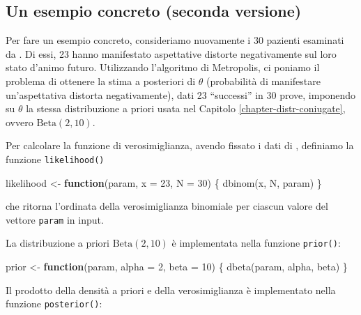 \documentclass[
  11pt,
]{krantz}
\makeatletter
\newenvironment{Shaded}{\begin{snugshade}}{\end{snugshade}}
\newcommand{\AttributeTok}[1]{\textcolor[rgb]{0.61,0.61,0.61}{#1}}
\newcommand{\ControlFlowTok}[1]{\textcolor[rgb]{0.27,0.27,0.27}{\textbf{#1}}}
\newcommand{\DecValTok}[1]{\textcolor[rgb]{0.06,0.06,0.06}{#1}}
\newcommand{\FunctionTok}[1]{\textcolor[rgb]{0,0,0}{#1}}
\newcommand{\NormalTok}[1]{#1}
\newcommand{\OtherTok}[1]{\textcolor[rgb]{0.37,0.37,0.37}{#1}}
\newenvironment{kframe}{%
\medskip{}
\setlength{\fboxsep}{.8em}
 \def\at@end@of@kframe{}%
 \ifinner\ifhmode%
  \def\at@end@of@kframe{\end{minipage}}%
  \begin{minipage}{\columnwidth}%
 \fi\fi%
 \def\FrameCommand##1{\hskip\@totalleftmargin \hskip-\fboxsep
 \colorbox{shadecolor}{##1}\hskip-\fboxsep
     \hskip-\linewidth \hskip-\@totalleftmargin \hskip\columnwidth}%
 \MakeFramed {\advance\hsize-\width
   \@totalleftmargin\z@ \linewidth\hsize
   \@setminipage}}%
 {\par\unskip\endMakeFramed%
 \at@end@of@kframe}
\renewenvironment{Shaded}{\begin{kframe}}{\end{kframe}}
\theoremstyle{definition}
\theoremstyle{definition}
\theoremstyle{definition}
\theoremstyle{definition}
\theoremstyle{remark}
\makeatother
\begin{document}
\hypertarget{un-esempio-concreto-seconda-versione}{%
\subsection{Un esempio concreto (seconda versione)}\label{un-esempio-concreto-seconda-versione}}

Per fare un esempio concreto, consideriamo nuovamente i 30 pazienti esaminati da \citet{zetschefuture2019}. Di essi, 23 hanno manifestato aspettative distorte negativamente sul loro stato d'animo futuro. Utilizzando l'algoritmo di Metropolis, ci poniamo il problema di ottenere la stima a posteriori di \(\theta\) (probabilità di manifestare un'aspettativa distorta negativamente), dati 23 ``successi'' in 30 prove, imponendo su \(\theta\) la stessa distribuzione a priori usata nel Capitolo \ref{chapter-distr-coniugate}, ovvero \(\mbox{Beta}(2, 10)\).

Per calcolare la funzione di verosimiglianza, avendo fissato i dati di \citet{zetschefuture2019}, definiamo la funzione \texttt{likelihood()}

\begin{Shaded}
\begin{Highlighting}[]
\NormalTok{likelihood }\OtherTok{\textless{}{-}} \ControlFlowTok{function}\NormalTok{(param, }\AttributeTok{x =} \DecValTok{23}\NormalTok{, }\AttributeTok{N =} \DecValTok{30}\NormalTok{) \{}
  \FunctionTok{dbinom}\NormalTok{(x, N, param)}
\NormalTok{\}}
\end{Highlighting}
\end{Shaded}

che ritorna l'ordinata della verosimiglianza binomiale per ciascun valore del vettore \texttt{param} in input.

La distribuzione a priori \(\mbox{Beta}(2, 10)\) è implementata nella funzione \texttt{prior()}:

\begin{Shaded}
\begin{Highlighting}[]
\NormalTok{prior }\OtherTok{\textless{}{-}} \ControlFlowTok{function}\NormalTok{(param, }\AttributeTok{alpha =} \DecValTok{2}\NormalTok{, }\AttributeTok{beta =} \DecValTok{10}\NormalTok{) \{}
  \FunctionTok{dbeta}\NormalTok{(param, alpha, beta) }
\NormalTok{\}}
\end{Highlighting}
\end{Shaded}

Il prodotto della densità a priori e della verosimiglianza è implementato nella funzione \texttt{posterior()}:
\end{document}
